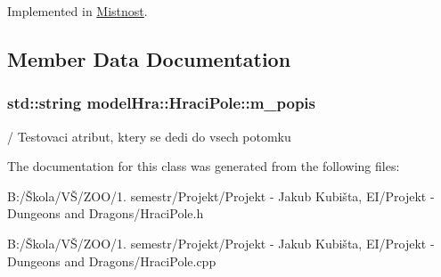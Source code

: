 Implemented in \hyperlink{class_mistnost_a5168a58b39e621a5d4c647d19f3ed5e2}{Mistnost}.



\subsection{Member Data Documentation}
\hypertarget{classmodel_hra_1_1_hraci_pole_a6e86c5af171a2f94c46f8523ffc228aa}{
\subsubsection[{m\-\_\-popis}]{\setlength{\rightskip}{0pt plus 5cm}std\-::string model\-Hra\-::\-Hraci\-Pole\-::m\-\_\-popis\hspace{0.3cm}{\ttfamily [protected]}}}\label{classmodel_hra_1_1_hraci_pole_a6e86c5af171a2f94c46f8523ffc228aa}
/ Testovaci atribut, ktery se dedi do vsech potomku 

The documentation for this class was generated from the following files\-:\begin{DoxyCompactItemize}
\item 
B\-:/Škola/\-VŠ/\-Z\-O\-O/1. semestr/\-Projekt/\-Projekt -\/ Jakub Kubišta, E\-I/\-Projekt -\/ Dungeons and Dragons/Hraci\-Pole.\-h\item 
B\-:/Škola/\-VŠ/\-Z\-O\-O/1. semestr/\-Projekt/\-Projekt -\/ Jakub Kubišta, E\-I/\-Projekt -\/ Dungeons and Dragons/Hraci\-Pole.\-cpp\end{DoxyCompactItemize}
